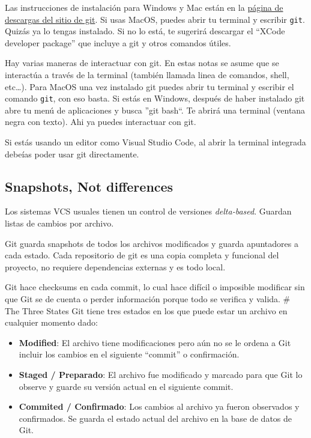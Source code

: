 \documentclass[spanish, 12pt, a4paper]{article}
\begin{document}
Las instrucciones de instalación para Windows y Mac están en la
\href{https://git-scm.com/downloads}{página de descargas del sitio de
git}. Si usas MacOS, puedes abrir tu terminal y escribir
\passthrough{\lstinline!git!}. Quizás ya lo tengas instalado. Si no lo
está, te sugerirá descargar el ``XCode developer package'' que incluye a
git y otros comandos útiles.

Hay varias maneras de interactuar con git. En estas notas se asume que
se interactúa a través de la terminal (también llamada linea de
comandos, shell, etc\ldots). Para MacOS una vez instalado git puedes
abrir tu terminal y escribir el comando \passthrough{\lstinline!git!},
con eso basta. Si estás en Windows, después de haber instalado git abre
tu menú de aplicaciones y busca ''git bash``. Te abrirá una terminal
(ventana negra con texto). Ahi ya puedes interactuar con git.

Si estás usando un editor como Visual Studio Code, al abrir la terminal
integrada debeías poder usar git directamente.

\subsection{Snapshots, Not differences}

Los sistemas VCS usuales tienen un control de versiones
\emph{delta-based}. Guardan listas de cambios por archivo.

Git guarda snapshots de todos los archivos modificados y guarda
apuntadores a cada estado. Cada repositorio de git es una copia completa
y funcional del proyecto, no requiere dependencias externas y es todo
local.

Git hace checksums en cada commit, lo cual hace difícil o imposible
modificar sin que Git se de cuenta o perder información porque todo se
verifica y valida. \# The Three States Git tiene tres estados en los que
puede estar un archivo en cualquier momento dado:

\begin{itemize}
\item
  \textbf{Modified}: El archivo tiene modificaciones pero aún no se le
  ordena a Git incluir los cambios en el siguiente ``commit'' o
  confirmación.
\item
  \textbf{Staged / Preparado}: El archivo fue modificado y marcado para
  que Git lo observe y guarde su versión actual en el siguiente commit.
\item
  \textbf{Commited / Confirmado}: Los cambios al archivo ya fueron
  observados y confirmados. Se guarda el estado actual del archivo en la
  base de datos de Git.
\end{itemize}
\end{document}
